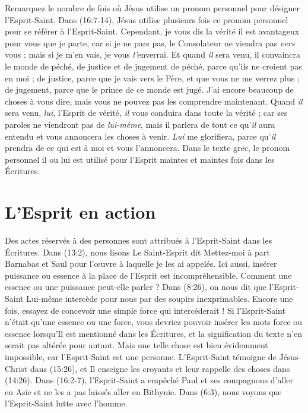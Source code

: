 Remarquez le nombre de fois où Jésus utilise un pronom personnel pour
 désigner l'Esprit-Saint. Dans (16:7-14), Jésus utilise
 plusieurs fois ce pronom personnel pour se référer à l'Esprit-Saint.
 \Og Cependant, je vous dis la vérité\frcolon{} il est avantageux pour vous
 que je parte, car si je ne pars pas, le Consolateur ne viendra pas
 \emph{vers} vous ; mais si je m'en vais, je vous \emph{l'}enverrai.
 Et quand \emph{il} sera venu, il convaincra le monde de péché,
 de justice et de jugement\frcolon{} de péché, parce qu'ils ne croient pas en moi ;
 de justice, parce que je vais vers le Père, et que vous ne me verrez plus ;
 de jugement, parce que le prince de ce monde est jugé.
 J'ai encore beaucoup de choses à vous dire, mais vous ne pouvez pas
 les comprendre maintenant. Quand \emph{il} sera venu, \emph{lui},
 l'Esprit de vérité, \emph{il} vous conduira dans toute la vérité ;
 car ses paroles ne viendront pas de \emph{lui-même}, mais il parlera de
 tout ce qu'\emph{il} aura entendu et vous annoncera les choses à venir.
 \emph{Lui} me glorifiera, parce qu'\emph{il} prendra de ce qui est à moi
 et vous l'annoncera. \Fg{}
 Dans le texte grec, le pronom personnel \Og il \Fg{} ou \Og lui \Fg{}
 est utilisé pour l'Esprit maintes et maintes fois dans les Écritures.

\section{L'Esprit en action}

Des actes réservés à des personnes sont attribués à l'Esprit-Saint dans les
 Écritures. Dans (13:2), nous lisons\frcolon{} \Og Le Saint-Esprit dit\frcolon{}
 Mettez-moi à part Barnabas et Saul pour l'œuvre à laquelle je les ai
 appelés. \Fg{}
 Ici aussi, insérer \Og puissance \Fg{} ou \Og essence \Fg{} à la place
 de l'Esprit est incompréhensible. Comment une essence ou une puissance
 peut-elle parler ? Dans (8:26), on nous dit que l'Esprit-Saint
 Lui-même intercède pour nous par des soupirs inexprimables.
 Encore une fois, essayez de concevoir une simple force qui intercéderait !
 Si l'Esprit-Saint n'était qu'une essence ou une force, vous devriez pouvoir
 insérer les mots \Og force \Fg{} ou \Og essence \Fg{} lorsqu'Il est mentionné
 dans les Écritures, et la signification du texte n'en serait pas altérée pour
 autant. Mais une telle chose est bien évidemment impossible, car
 l'Esprit-Saint est une personne. L'Esprit-Saint témoigne de Jésus-Christ dans
 (15:26), et Il enseigne les croyants et leur rappelle des choses
 dans (14:26). Dans (16:2-7), l'Esprit-Saint a
 empêché Paul et ses compagnons d'aller en Asie et ne les a pas laissés aller
 en Bithynie. Dans (6:3), nous voyons que l'Esprit-Saint lutte
 avec l'homme.

